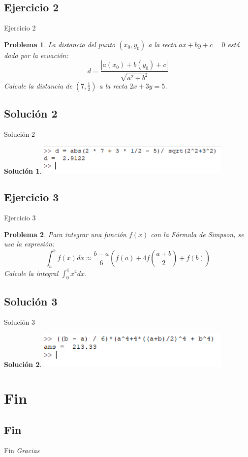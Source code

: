 \documentclass[12pt]{beamer}
\newtheorem{prob}{Problema}
\newtheorem{sol}{Solución}
\begin{document}
\subsection{Ejercicio 2}
\begin{frame}{Ejercicio 2}
\begin{prob}
	La distancia del punto $(x_0, y_0)$ a la recta $ax + by + c = 0$ está dada por la ecuación:
	\[d = \frac{|a(x_0) + b(y_0) + c|}{\sqrt{a^2 + b^2}}\]
	Calcule la distancia de $(7, \frac{1}{2})$ a la recta $2x + 3y = 5$. 
\end{prob}
\end{frame}
\subsection{Solución 2}
\begin{frame}{Solución 2}
\begin{sol}
	 \includegraphics[width=270pt]{images/sol2.png}
\end{sol}
\end{frame}

\subsection{Ejercicio 3}
\begin{frame}{Ejercicio 3}
	\begin{prob}
		Para integrar una función $f(x)$ con la Fórmula de Simpson, se usa la expresión:
		\[
		\int_{a}^{b} {f(x) dx} \approx \frac{b - a}{6}\left(f(a) + 4f\left(\frac{a + b}{2}\right) + f(b)\right)
		\]
		Calcule la integral $\int_{0}^{4}{x^4 dx}$.
	\end{prob}
\end{frame}

\subsection{Solución 3}
\begin{frame}{Solución 3}
\begin{sol}
	 \includegraphics[width=270pt]{images/sol3.png}	
\end{sol}
\end{frame}
\section{Fin}
\subsection{Fin}
\begin{frame}{Fin}
	\centering \Huge
	\emph{Gracias}
\end{frame}
\end{document}

